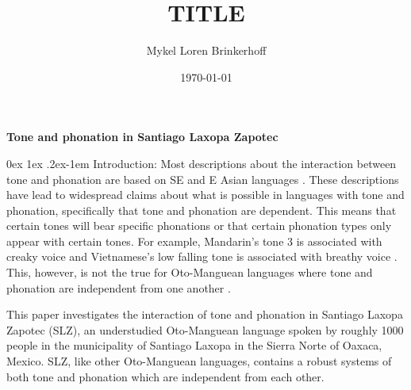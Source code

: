 \documentclass[12pt, letterpaper]{article}
\title{TITLE}
\author{Mykel Loren Brinkerhoff}
\date{\today}
\makeatletter
\renewcommand{\paragraph}{%
  \@startsection{paragraph}{4}%
  {\z@}{0ex \@plus 1ex \@minus .2ex}{-1em}%
  {\normalfont\normalsize\bfseries}%
}
\makeatother
\begin{document}
	

	
	
\begin{center}
	\textbf{Tone and phonation in Santiago Laxopa Zapotec}
\end{center}
\thispagestyle{empty}

\paragraph{Introduction:}
Most descriptions about the interaction between tone and phonation are based on SE and E Asian languages \citep[e.g.,][]{masicaDefiningLinguisticArea1976,thurgoodVietnameseTonogenesisRevising2002,michaudComplexTonesEast2012,brunelleTonePhonationSoutheast2016,kuangCovariationVoiceQuality2017}.
These descriptions have lead to widespread claims about what is possible in languages with tone and phonation, specifically that tone and phonation are dependent. 
This means that certain tones will bear specific phonations or that certain phonation types only appear with certain tones. 
For example, Mandarin's tone 3 is associated with creaky voice \citep{hockettPeipingPhonology1947} and Vietnamese's low falling tone is associated with breathy voice \citep{thurgoodVietnameseTonogenesisRevising2002}.
This, however, is not the true for Oto-Manguean languages where tone and phonation are independent from one another \citep{silvermanLaryngealComplexityOtomanguean1997}.

This paper investigates the interaction of tone and phonation in Santiago Laxopa Zapotec (SLZ), an understudied Oto-Manguean language spoken by roughly 1000 people in the municipality of Santiago Laxopa in the Sierra Norte of Oaxaca, Mexico.
SLZ, like other Oto-Manguean languages, contains a robust systems of both tone and phonation which are independent from each other.
\end{document}
